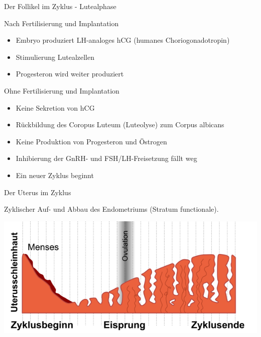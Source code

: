 \documentclass{beamer}
\begin{document}
\begin{frame}{Der Follikel im Zyklus - Lutealphase}
    
    

\begin{block}{Nach Fertilisierung und Implantation}
\begin{itemize}
    \item 
Embryo produziert LH-analoges hCG (humanes Choriogonadotropin) \item
Stimulierung Lutealzellen
\item
Progesteron wird weiter produziert
\end{itemize}
\end{block}

\begin{block}{Ohne Fertilisierung und Implantation}
\begin{itemize}
    \item 
Keine Sekretion von hCG
\item
Rückbildung des Coropus Luteum (Luteolyse) zum Corpus albicans
\item
Keine Produktion von Progesteron und Östrogen
\item
Inhibierung der GnRH- und FSH/LH-Freisetzung fällt weg
\item
Ein neuer Zyklus beginnt
\end{itemize}
\end{block}

\end{frame}




\begin{frame}{Der  Uterus  im Zyklus}

Zyklischer Auf- und Abbau des Endometriums (Stratum functionale).

\includegraphics[width=\textwidth]{zyklus_endometrium.png}

\end{frame}
\end{document}
